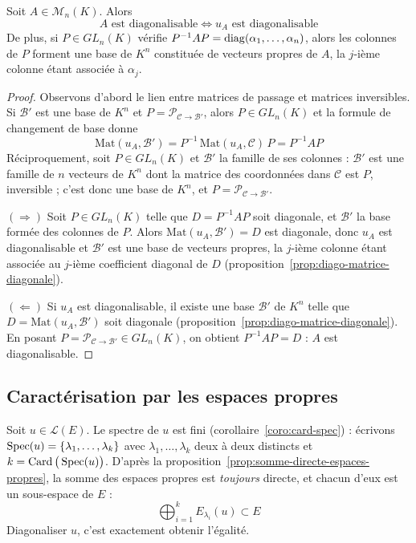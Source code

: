 \begin{prop}
\label{prop:diago-matrice-endo}
Soit $A\in\mathcal{M}_n(K)$. Alors
\[A \text{ est diagonalisable} \iff u_A \text{ est diagonalisable}\]
De plus, si $P\in GL_n(K)$ vérifie $P^{-1}AP=\operatorname{diag}(\alpha_1,\dots,\alpha_n)$, alors les colonnes de $P$ forment une base de $K^n$ constituée de vecteurs propres de $A$, la $j$-ième colonne étant associée à $\alpha_j$.
\end{prop}

\begin{proof}
Observons d'abord le lien entre matrices de passage et matrices inversibles. Si $\mathcal{B}'$ est une base de $K^n$ et $P=\mathcal{P}_{\mathcal{C}\to\mathcal{B}'}$, alors $P\in GL_n(K)$ et la formule de changement de base donne
\[\mathrm{Mat}(u_A,\mathcal{B}') = P^{-1}\,\mathrm{Mat}(u_A,\mathcal{C})\,P = P^{-1}AP\]
Réciproquement, soit $P\in GL_n(K)$ et $\mathcal{B}'$ la famille de ses colonnes : $\mathcal{B}'$ est une famille de $n$ vecteurs de $K^n$ dont la matrice des coordonnées dans $\mathcal{C}$ est $P$, inversible ; c'est donc une base de $K^n$, et $P=\mathcal{P}_{\mathcal{C}\to\mathcal{B}'}$.

$(\Rightarrow)$ Soit $P\in GL_n(K)$ telle que $D=P^{-1}AP$ soit diagonale, et $\mathcal{B}'$ la base formée des colonnes de $P$. Alors $\mathrm{Mat}(u_A,\mathcal{B}')=D$ est diagonale, donc $u_A$ est diagonalisable et $\mathcal{B}'$ est une base de vecteurs propres, la $j$-ième colonne étant associée au $j$-ième coefficient diagonal de $D$ (proposition~\ref{prop:diago-matrice-diagonale}).

$(\Leftarrow)$ Si $u_A$ est diagonalisable, il existe une base $\mathcal{B}'$ de $K^n$ telle que $D=\mathrm{Mat}(u_A,\mathcal{B}')$ soit diagonale (proposition~\ref{prop:diago-matrice-diagonale}). En posant $P=\mathcal{P}_{\mathcal{C}\to\mathcal{B}'}\in GL_n(K)$, on obtient $P^{-1}AP=D$ : $A$ est diagonalisable.
\end{proof}

\subsection{Caractérisation par les espaces propres}

Soit $u\in\mathcal{L}(E)$. Le spectre de $u$ est fini (corollaire~\ref{coro:card-spec}) : écrivons $\operatorname{Spec}(u)=\{\lambda_1,\dots,\lambda_k\}$ avec $\lambda_1,\dots,\lambda_k$ deux à deux distincts et $k=\operatorname{Card}\big(\operatorname{Spec}(u)\big)$. D'après la proposition~\ref{prop:somme-directe-espaces-propres}, la somme des espaces propres est \emph{toujours} directe, et chacun d'eux est un sous-espace de $E$ :
\[\bigoplus_{i=1}^{k} E_{\lambda_i}(u) \subset E\]
Diagonaliser $u$, c'est exactement obtenir l'égalité.

